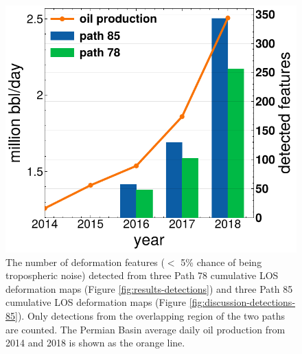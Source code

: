 \begin{figure}
	\centering 
	\includegraphics[width=.55\linewidth]{figures/chapter6-blobs/figure_discussion_oil_vs_blob_count.pdf}
	\caption{
		The number of deformation features ($<$ 5\% chance of being tropospheric noise) detected from three Path 78 cumulative LOS deformation maps (Figure \ref{fig:results-detections}) and three Path 85 cumulative LOS deformation maps (Figure \ref{fig:discussion-detections-85}). Only detections from the overlapping region of the two paths are counted. The Permian Basin average daily oil production from 2014 and 2018 is shown as the orange line.
	}
	\label{fig:discussion-oil-blob-count}
\end{figure}
